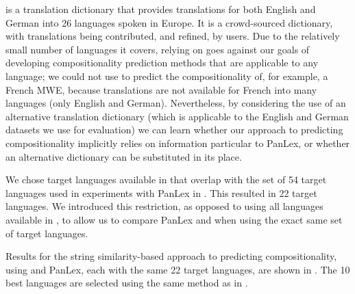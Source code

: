 \documentclass[output=paper
,modfonts
,nonflat]{langsci/langscibook}
\begin{document}
\dictcc is a translation dictionary that provides translations for
both English and German into 26 languages spoken in Europe. It is a
crowd-sourced dictionary, with translations being contributed, and
refined, by users. Due to the relatively small number of languages it
covers, relying on \dictcc goes against our goals of developing
compositionality prediction methods that are applicable to any
language; we could not use \dictcc to predict the compositionality of,
for example, a French MWE, because translations are not available for
French into many languages (only English and German). Nevertheless, by
considering the use of an alternative translation dictionary (which is
applicable to the English and German datasets we use for evaluation)
we can learn whether our approach to predicting compositionality
implicitly relies on information particular to PanLex, or whether an
alternative dictionary can be substituted in its place.

We chose target languages available in \dictcc that overlap with the
set of 54 target languages used in experiments with PanLex in
. This resulted in 22 target
languages. We introduced this restriction, as opposed to using all
languages available in \dictcc, to allow us to compare PanLex and
\dictcc when using the exact same set of target languages.

Results for the string similarity-based approach to predicting
compositionality, using \dictcc and PanLex, each with the same 22
target languages, are shown in
. The 10 best languages are
selected using the same method as in .

\end{document}
